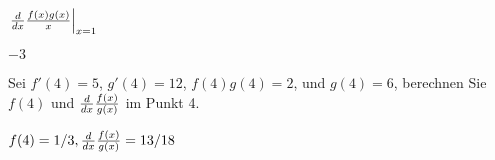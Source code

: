 \begin{exercises}
\begin{exercise} $\left. \frac{d}{dx} \frac{f(x)g(x)}{x} \right|_{x=1}$
\begin{answer} $-3$
\end{answer}\end{exercise}
\endtwocol


\begin{exercise} Sei $f'(4) = 5$, $g'(4) = 12$, $f(4)g(4)=2$, und $g(4) = 6$,
berechnen Sie $f(4)$ und $\frac{d}{dx}\frac{f(x)}{g(x)}$ im Punkt 4.
\begin{answer} $f(4) = 1/3, \frac{d}{dx} \frac{f(x)}{g(x)} = 13/18$
\end{answer}\end{exercise}

\end{exercises}
